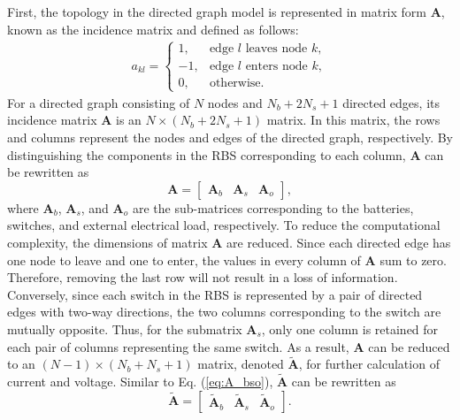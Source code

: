 \documentclass{article}
\begin{document}
First, the topology in the directed graph model is represented in matrix form $\bm{A}$, known as the incidence matrix and defined as follows:
\begin{align}\label{eq:A}
    a_{kl}=
    \begin{cases}
        1,  & \text{edge $l$ leaves node $k$},\\
        -1, & \text{edge $l$ enters node $k$},\\
        0,  & \text{otherwise}.
    \end{cases}
\end{align}
For a directed graph consisting of $N$ nodes and $N_b+2N_s+1$ directed edges, its incidence matrix $\bm{A}$ is an $N\times(N_b+2N_s+1)$ matrix. 
In this matrix, the rows and columns represent the nodes and edges of the directed graph, respectively.
By distinguishing the components in the RBS corresponding to each column, $\bm{A}$ can be rewritten as
\begin{equation}\label{eq:A_bso}
    \bm{A} =
    \begin{bmatrix}
        \bm{A}_b & \bm{A}_s & \bm{A}_o
    \end{bmatrix},
\end{equation}
where $\bm{A}_b$, $\bm{A}_s$, and $\bm{A}_o$ are the sub-matrices corresponding to the batteries, switches, and external electrical load, respectively.
To reduce the computational complexity, the dimensions of matrix $\bm{A}$ are reduced.
Since each directed edge has one node to leave and one to enter, the values in every column of $\bm{A}$ sum to zero.
Therefore, removing the last row will not result in a loss of information. 
Conversely, since each switch in the RBS is represented by a pair of directed edges with two-way directions, the two columns corresponding to the switch are mutually opposite.
Thus, for the submatrix $\bm{A}_s$, only one column is retained for each pair of columns representing the same switch.
As a result, $\bm{A}$ can be reduced to an $(N-1)\times(N_b+N_s+1)$ matrix, denoted  $\bm{\tilde{A}}$, for further calculation of current and voltage.
Similar to Eq. (\ref{eq:A_bso}), $\bm{\tilde{A}}$ can be rewritten as
\begin{equation}\label{eq:A_bso_tilde}
    \bm{\tilde{A}} =
    \begin{bmatrix}
        \bm{\tilde{A}}_b & \bm{\tilde{A}}_s & \bm{\tilde{A}}_o
    \end{bmatrix}.
\end{equation}
\end{document}
